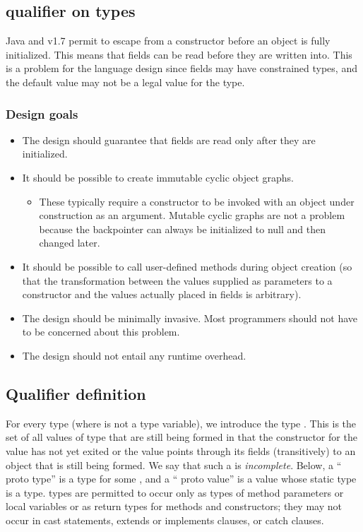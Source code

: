 \subsection{ qualifier on types}
\label{Prototypes}
  Java and \Xten{} v1.7 permit  to escape from a constructor before an
  object is fully initialized. This means that fields can be read
  before they are written into. This is a problem for the \Xten{} language
  design since fields may have constrained types, and the default
  value  may not be a legal value for the type.
  
\subsubsection{Design goals}

 \begin{itemize}
\item  The design should guarantee that fields are read only after they are initialized. 
\item  It should be possible to create immutable cyclic object graphs. 
\begin{itemize}
\item These typically require a constructor to be invoked with an
  object under construction as an argument. Mutable cyclic graphs are
  not a problem because the backpointer can always be initialized to
  null and then changed later.
\end{itemize}
 
\item  It should be possible to call user-defined methods during object creation (so that the transformation between the values supplied as parameters to a constructor and the values actually placed in fields is arbitrary). 
\item  The design should be minimally invasive. Most programmers should not have to be concerned about this problem. 
\item  The design should not entail any runtime overhead.
\end{itemize}
 
\subsection{Qualifier definition}

For every type  (where  is not a type variable), we introduce the
  type . This is the set of all values  of type  that are
  still being formed in that the constructor for the value has not yet
  exited or the value points through its fields (transitively) to an
  object that is still being formed. We say that such a  is
  \emph{incomplete}. Below, a `` proto type'' is a type  for
  some , and a `` proto value'' is a value  whose static type is a
   type.  types are permitted to occur only as types of
  method parameters or local variables or as return types for methods
  and constructors; they may not occur in cast statements, extends or
  implements clauses, or catch clauses.

